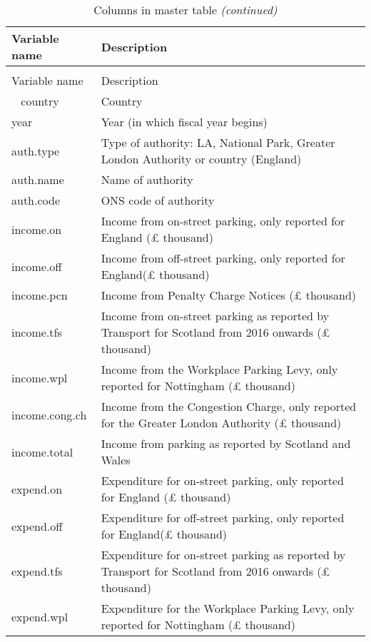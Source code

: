 \documentclass[]{article}
\begin{document}
\begin{longtabu} to 
\caption{\label{tab:unnamed-chunk-2}Columns in master table}\\
\toprule
Variable name & Description\\
\midrule
\endfirsthead
\caption[]{\label{tab:unnamed-chunk-2}Columns in master table \textit{(continued)}}\\
\toprule
Variable name & Description\\
\midrule
\endhead
\
\endfoot
\bottomrule
\endlastfoot
{}  country & Country\\
year & Year (in which fiscal year begins)\\
\rowcolor{gray!6}  auth.type & Type of authority: LA, National Park, Greater London Authority or country (England)\\
auth.name & Name of authority\\
  auth.code & ONS code of authority\\
\addlinespace
income.on & Income from on-street parking, only reported for England (£ thousand)\\
\rowcolor{gray!6}  income.off & Income from off-street parking, only reported for England(£ thousand)\\
income.pcn & Income from Penalty Charge Notices (£ thousand)\\
  income.tfs & Income from on-street parking as reported by Transport for Scotland from 2016 onwards (£ thousand)\\
income.wpl & Income from the Workplace Parking Levy, only reported for Nottingham (£ thousand)\\
\addlinespace
{}  income.cong.ch & Income from the Congestion Charge, only reported for the Greater London Authority (£ thousand)\\
income.total & Income from parking as reported by Scotland and Wales\\
\rowcolor{gray!6}  expend.on & Expenditure for on-street parking, only reported for England (£ thousand)\\
expend.off & Expenditure for off-street parking, only reported for England(£ thousand)\\
\rowcolor{gray!6}  expend.tfs & Expenditure for on-street parking as reported by Transport for Scotland from 2016 onwards (£ thousand)\\
\addlinespace
expend.wpl & Expenditure for the Workplace Parking Levy, only reported for Nottingham (£ thousand)\\

\end{longtabu}
\end{document}
